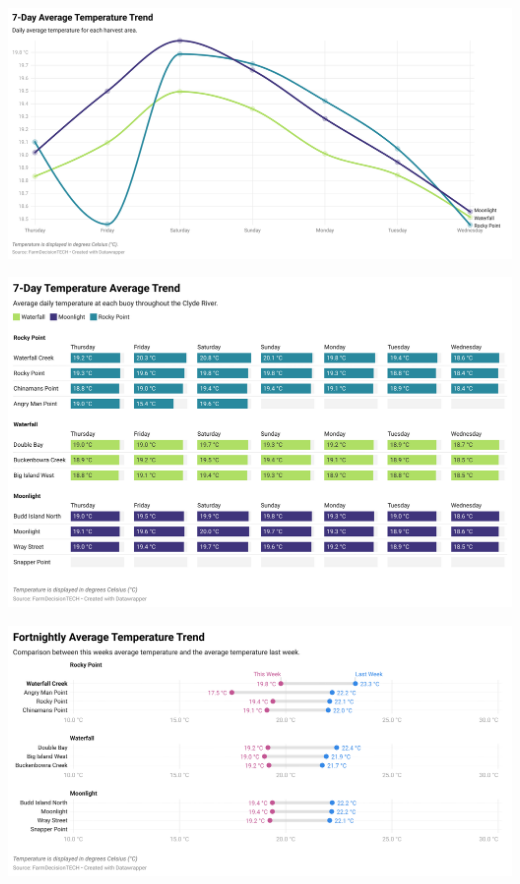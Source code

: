 \documentclass[10pt]{article}
\begin{document}
\begin{SidewaysFigure}
\centering
\includegraphics[width=1.3\textwidth]{weekly-temperature-chart.png}
\end{SidewaysFigure}
\vfill
\newpage

\begin{SidewaysFigure}
\centering
\includegraphics[width=1.3\textwidth]{weekly-temperature.png}
\end{SidewaysFigure}
\vfill
\newpage

\begin{SidewaysFigure}
\centering
\includegraphics[width=1.3\textwidth]{fortnightly-temperature.png}
\end{SidewaysFigure}
\vfill
\newpage
\end{document}
